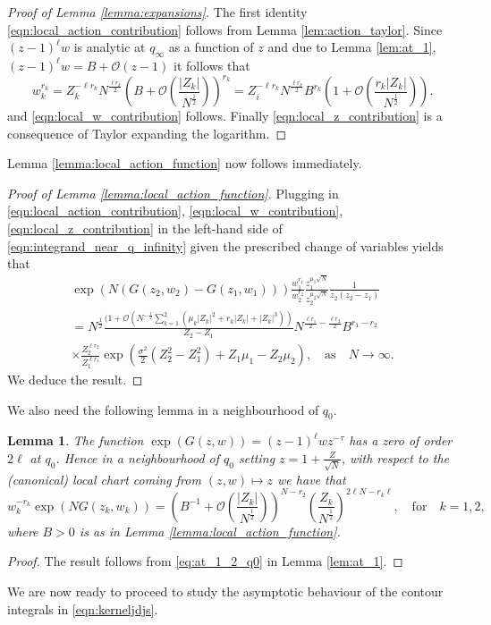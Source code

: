 \documentclass[11pt]{article}
\theoremstyle{plain}
\newtheorem{lemma}[theorem]{Lemma}
\theoremstyle{definition}
\numberwithin{equation}{section}
\begin{document}
\begin{proof}[Proof of Lemma \ref{lemma:expansions}]
The first identity \eqref{eqn:local_action_contribution} follows from Lemma \ref{lem:action_taylor}.
Since $(z-1)^{\ell}w$ is analytic at $q_{\infty}$ as a function of $z$ and due to Lemma \ref{lem:at_1}, $(z-1)^{\ell} w=B+\mathcal{O}(z-1)$ it follows that 
\begin{equation}
w_k^{r_k}=
Z_k^{-\ell r_k} 
N^{\frac{\ell r_k}{2}} 
\left(B+\mathcal{O}\left(\frac{|Z_k|}{N^{\frac{1}{2}}}\right)\right)^{r_k}
=
Z_i^{-\ell r_k} 
N^{\frac{\ell r_k}{2}} 
B^{r_k}\left(1+\mathcal{O}\left(\frac{r_k|Z_k|}{N^{\frac{1}{2}}}\right)\right).
\end{equation}
and \eqref{eqn:local_w_contribution} follows. Finally \eqref{eqn:local_z_contribution} is a consequence of Taylor expanding the logarithm.
\end{proof}

Lemma \ref{lemma:local_action_function} now follows immediately.
\begin{proof}[Proof of Lemma \ref{lemma:local_action_function}]
%

%

%

Plugging in \eqref{eqn:local_action_contribution}, \eqref{eqn:local_w_contribution}, \eqref{eqn:local_z_contribution} in the left-hand side of \eqref{eqn:integrand_near_q_infinity} given the prescribed change of variables yields that
\begin{multline} 
\exp\left({N(G(z_2,w_2)-G(z_1,w_1))}\right)
\frac{w_1^{r_1}}{w_2^{r_2}}
 \frac{z_1^{\mu_1\sqrt{N}}}{z_2^{\mu_2\sqrt{N}}}
 \frac{1}{z_2(z_2-z_1)}
\\
= N^{\frac{1}{2}} \frac{(1+\mathcal{O}\left( N^{-\frac{1}{2}}
\sum_{k=1}^{2} (\mu_k|Z_k|^2 +r_k |Z_k|+|Z_k|^3) \right)}{Z_2-Z_1} 
N^{\frac{\ell r_1}{2}-\frac{\ell r_2}{2}} 
B^{ r_1- r_2} 
\\ \times 
\frac{Z_2^{\ell r_2}}{Z_1^{\ell r_1}}
\exp\left(\frac{\sigma^2}{2}(Z_2^2-Z_1^2)+Z_1\mu_1-Z_2\mu_2\right),\quad \text{as}\quad N\rightarrow\infty.
\end{multline} 
We deduce the result. 
\end{proof}
%
%
%
We also need the following lemma in a neighbourhood of $q_{0}$. 
\begin{lemma}\label{lemma:G_at_q0}
The function 
$\exp(G(z,w))= (z-1)^{\ell} w z^{-\tau }$ has a zero of order $2\ell$ at $q_0$. Hence in a neighbourhood of $q_0$ setting $z=1+\frac{Z}{\sqrt{N}}$, with respect to the (canonical) local chart coming from $(z,w)\mapsto z$ we have that
\begin{equation} \label{eqn:afnearq0}
w_k^{-r_k}\exp(NG(z_k,w_k))=\left(B^{-1}+\mathcal{O}\left(\frac{|Z_k|}{N^{\frac{1}{2}}}\right)\right)^{N-r_2}\left(\frac{Z_k}{N^{\frac{1}{2}}}\right)^{2\ell N-r_k\ell},\quad\text{for}\quad k=1,2,
\end{equation}
where $B>0$ is as in Lemma \ref{lemma:local_action_function}.
\end{lemma}
\begin{proof}
The result follows from \eqref{eq:at_1_2_q0} in Lemma \ref{lem:at_1}.
\end{proof}
We are now ready to proceed to study the asymptotic behaviour of the contour integrals in \eqref{eqn:kerneljdjs}.
%
%
%
%
%
\end{document}
